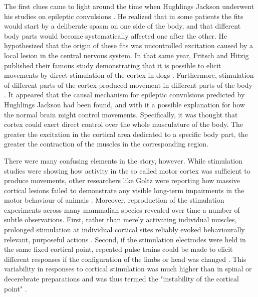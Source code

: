 The first clues came to light around the time when Hughlings Jackson underwent his studies on epileptic convulsions \cite{Jackson1870}. He realized that in some patients the fits would start by a deliberate spasm on one side of the body, and that different body parts would become systematically affected one after the other. He hypothesized that the origin of these fits was uncontrolled excitation caused by a local lesion in the central nervous system. In that same year, Fritsch and Hitzig published their famous study demonstrating that it is possible to elicit movements by direct stimulation of the cortex in dogs \cite{Fritsch1870}. Furthermore, stimulation of different parts of the cortex produced movement in different parts of the body \cite{Fritsch1870,Ferrier1873}. It appeared that the causal mechanism for epileptic convulsions predicted by Hughlings Jackson had been found, and with it a possible explanation for how the normal brain might control movements. Specifically, it was thought that cortex could exert direct control over the whole musculature of the body. The greater the excitation in the cortical area dedicated to a specific body part, the greater the contraction of the muscles in the corresponding region.

There were many confusing elements in the story, however. While stimulation studies were showing how activity in the so called motor cortex was sufficient to produce movements, other researchers like Goltz were reporting how massive cortical lesions failed to demonstrate any visible long-term impairments in the motor behaviour of animals \cite{Goltz1888}. Moreover, reproduction of the stimulation experiments across many mammalian species \cite{Ferrier1873,Clark1937} revealed over time a number of subtle observations. First, rather than merely activating individual muscles, prolonged stimulation at individual cortical sites reliably evoked behaviourally relevant, purposeful actions \cite{Ferrier1873,Clark1937}. Second, if the stimulation electrodes were held in the same fixed cortical point, repeated pulse trains could be made to elicit different responses if the configuration of the limbs or head was changed \cite{Ward1938}. This variability in responses to cortical stimulation was much higher than in spinal or decerebrate preparations and was thus termed the "instability of the cortical point" \cite{Brown1912,Leyton1917}.